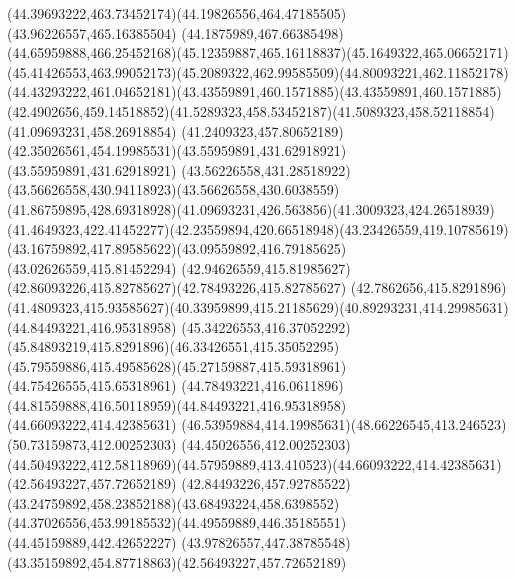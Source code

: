 {{\curveto(44.39693222,463.73452174)(44.19826556,464.47185505)(43.96226557,465.16385504)
\lineto(44.1875989,467.66385498)
\curveto(44.65959888,466.25452168)(45.12359887,465.16118837)(45.1649322,465.06652171)
\curveto(45.41426553,463.99052173)(45.2089322,462.99585509)(44.80093221,462.11852178)
\curveto(44.43293222,461.04652181)(43.43559891,460.1571885)(43.43559891,460.1571885)
\curveto(42.4902656,459.14518852)(41.5289323,458.53452187)(41.5089323,458.52118854)
\lineto(41.09693231,458.26918854)
\lineto(41.2409323,457.80652189)
\curveto(42.35026561,454.19985531)(43.55959891,431.62918921)(43.55959891,431.62918921)
\curveto(43.56226558,431.28518922)(43.56626558,430.94118923)(43.56626558,430.6038559)
\curveto(41.86759895,428.69318928)(41.09693231,426.563856)(41.3009323,424.26518939)
\curveto(41.4649323,422.41452277)(42.23559894,420.66518948)(43.23426559,419.10785619)
\curveto(43.16759892,417.89585622)(43.09559892,416.79185625)(43.02626559,415.81452294)
\curveto(42.94626559,415.81985627)(42.86093226,415.82785627)(42.78493226,415.82785627)
\lineto(42.7862656,415.8291896)
\curveto(41.4809323,415.93585627)(40.33959899,415.21185629)(40.89293231,414.29985631)
\moveto(44.84493221,416.95318958)
\curveto(45.34226553,416.37052292)(45.84893219,415.8291896)(46.33426551,415.35052295)
\curveto(45.79559886,415.49585628)(45.27159887,415.59318961)(44.75426555,415.65318961)
\curveto(44.78493221,416.0611896)(44.81559888,416.50118959)(44.84493221,416.95318958)
\moveto(44.66093222,414.42385631)
\curveto(46.53959884,414.19985631)(48.66226545,413.246523)(50.73159873,412.00252303)
\lineto(44.45026556,412.00252303)
\curveto(44.50493222,412.58118969)(44.57959889,413.410523)(44.66093222,414.42385631)
\moveto(42.56493227,457.72652189)
\curveto(42.84493226,457.92785522)(43.24759892,458.23852188)(43.68493224,458.6398552)
\curveto(44.37026556,453.99185532)(44.49559889,446.35185551)(44.45159889,442.42652227)
\curveto(43.97826557,447.38785548)(43.35159892,454.87718863)(42.56493227,457.72652189)
}
}
